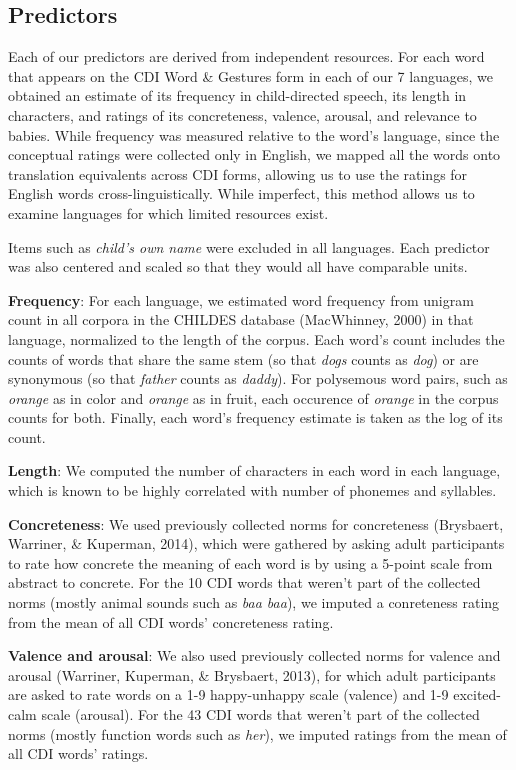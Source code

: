 \documentclass[10pt, letterpaper]{article}
\begin{document}
\subsection{Predictors}\label{predictors}

Each of our predictors are derived from independent resources. For each
word that appears on the CDI Word \& Gestures form in each of our 7
languages, we obtained an estimate of its frequency in child-directed
speech, its length in characters, and ratings of its concreteness,
valence, arousal, and relevance to babies. While frequency was measured
relative to the word's language, since the conceptual ratings were
collected only in English, we mapped all the words onto translation
equivalents across CDI forms, allowing us to use the ratings for English
words cross-linguistically. While imperfect, this method allows us to
examine languages for which limited resources exist.

Items such as \emph{child's own name} were excluded in all languages.
Each predictor was also centered and scaled so that they would all have
comparable units.

\textbf{Frequency}: For each language, we estimated word frequency from
unigram count in all corpora in the CHILDES database (MacWhinney, 2000)
in that language, normalized to the length of the corpus. Each word's
count includes the counts of words that share the same stem (so that
\emph{dogs} counts as \emph{dog}) or are synonymous (so that
\emph{father} counts as \emph{daddy}). For polysemous word pairs, such
as \emph{orange} as in color and \emph{orange} as in fruit, each
occurence of \emph{orange} in the corpus counts for both. Finally, each
word's frequency estimate is taken as the log of its count.

\textbf{Length}: We computed the number of characters in each word in
each language, which is known to be highly correlated with number of
phonemes and syllables.

\textbf{Concreteness}: We used previously collected norms for
concreteness (Brysbaert, Warriner, \& Kuperman, 2014), which were
gathered by asking adult participants to rate how concrete the meaning
of each word is by using a 5-point scale from abstract to concrete. For
the 10 CDI words that weren't part of the collected norms (mostly animal
sounds such as \emph{baa baa}), we imputed a conreteness rating from the
mean of all CDI words' concreteness rating.

\textbf{Valence and arousal}: We also used previously collected norms
for valence and arousal (Warriner, Kuperman, \& Brysbaert, 2013), for
which adult participants are asked to rate words on a 1-9 happy-unhappy
scale (valence) and 1-9 excited-calm scale (arousal). For the 43 CDI
words that weren't part of the collected norms (mostly function words
such as \emph{her}), we imputed ratings from the mean of all CDI words'
ratings.
\end{document}
